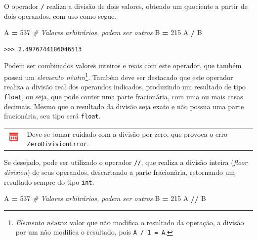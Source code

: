 \documentclass[
]{book}
\newenvironment{Shaded}{\begin{snugshade}}{\end{snugshade}}
\newcommand{\CommentTok}[1]{\textcolor[rgb]{0.56,0.35,0.01}{\textit{#1}}}
\newcommand{\DecValTok}[1]{\textcolor[rgb]{0.00,0.00,0.81}{#1}}
\newcommand{\NormalTok}[1]{#1}
\newcommand{\OperatorTok}[1]{\textcolor[rgb]{0.81,0.36,0.00}{\textbf{#1}}}
\begin{document}
O operador \texttt{/} realiza a divisão de dois valores, obtendo um quociente a partir de dois operandos, com uso como segue.

\begin{Shaded}
\begin{Highlighting}[]
\NormalTok{A }\OperatorTok{=} \DecValTok{537} \CommentTok{\# Valores arbitrários, podem ser outros}
\NormalTok{B }\OperatorTok{=} \DecValTok{215}
\NormalTok{A }\OperatorTok{/}\NormalTok{ B}
\end{Highlighting}
\end{Shaded}

\begin{verbatim}
>>> 2.4976744186046513
\end{verbatim}

Podem ser combinados valores inteiros e reais com este operador, que também possui um \emph{elemento nêutro}\footnote{\emph{Elemento nêutro}: valor que não modifica o resultado da operação, a divisão por um não modifica o resultado, pois \texttt{A\ /\ 1\ =\ A}.}. Também deve ser destacado que este operador realiza a divisão real dos operandos indicados, produzindo um resultado de tipo \texttt{float}, ou seja, que pode conter uma parte fracionária, com uma ou mais casas decimais. Mesmo que o resultado da divisão seja exato e não possua uma parte fracionária, seu tipo será \texttt{float}.

\begin{longtable}[]{@{}
  >{\centering\arraybackslash}p{}
  >{\raggedright\arraybackslash}p{}@{}}
\toprule
& \\
\midrule
\endhead
\includegraphics{images/application-red.png} & Deve-se tomar cuidado com a divisão por zero, que provoca o erro \texttt{ZeroDivisionError}. \\
\bottomrule
\end{longtable}

Se desejado, pode ser utilizado o operador \texttt{//}, que realiza a divisão inteira (\emph{floor division}) de seus operandos, descartando a parte fracionária, retornando um resultado sempre do tipo \texttt{int}.

\begin{Shaded}
\begin{Highlighting}[]
\NormalTok{A }\OperatorTok{=} \DecValTok{537} \CommentTok{\# Valores arbitrários, podem ser outros}
\NormalTok{B }\OperatorTok{=} \DecValTok{215}
\NormalTok{A }\OperatorTok{//}\NormalTok{ B}
\end{Highlighting}
\end{Shaded}
\end{document}
